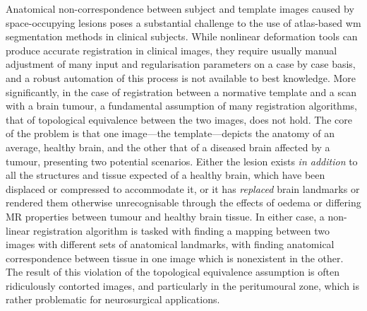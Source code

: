 \documentclass[12pt,phd,a4paper,twoside]{ucl_thesis}
\begin{document}
Anatomical non-correspondence between subject and template images caused by space-occupying lesions poses a substantial challenge to the use of atlas-based \gls{wm} segmentation methods in clinical subjects.
While nonlinear deformation tools can produce accurate registration in clinical images, they require usually manual adjustment of many input and regularisation parameters on a case by case basis, and a robust automation of this process is not available to best knowledge.
More significantly, in the case of registration between a normative template and a scan with a brain tumour, a fundamental assumption of many registration algorithms, that of topological equivalence between the two images, does not hold\autocite{Zacharaki2009}.
The core of the problem is that one image---the template---depicts the anatomy of an average, healthy brain, and the other that of a diseased brain affected by a tumour, presenting two potential scenarios.
Either the lesion exists \textit{in addition} to all the structures and tissue expected of a healthy brain, which have been displaced or compressed to accommodate it, or it has \textit{replaced} brain landmarks or rendered them otherwise unrecognisable through the effects of oedema or differing MR properties between tumour and healthy brain tissue.
In either case, a non-linear registration algorithm is tasked with finding a mapping between two images with different sets of anatomical landmarks, with finding anatomical correspondence between tissue in one image which is nonexistent in the other.
The result of this violation of the topological equivalence assumption is often ridiculously contorted images, and particularly in the peritumoural zone, which is rather problematic for neurosurgical applications.
\end{document}
